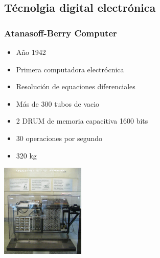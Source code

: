 \documentclass{beamer}
\begin{document}
\subsection{Técnolgia digital electrónica}
\begin{frame}
	\frametitle{Atanasoff-Berry Computer}
	\begin{minipage}[c]{7.5cm}
		\begin{itemize}
			\item Año 1942
			\item Primera computadora electrócnica 
			\item Resolución de equaciones diferenciales
			\item Más de 300 tubos de vacio
			\item 2 DRUM de memoria capacitiva 1600 bits
			\item 30 operaciones por segundo
			\item 320 kg
		\end{itemize}
	\end{minipage}
	\begin{minipage}[c]{4cm}
		\begin{center}
			\includegraphics[width=4cm]{Atanasoff-Berry_Computer_at_Durhum_Center.jpg}
		\end{center}
	\end{minipage}
\end{frame}
\end{document}
